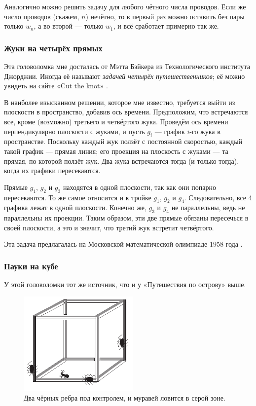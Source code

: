 Аналогично можно решить задачу для любого чётного числа проводов. Если же число проводов (скажем, $n$) нечётно, то в первый раз можно оставить без пары только $w_n$, а во второй --- только $w_1$, и всё сработает примерно так же.

\subsubsection*{Жуки на четырёх прямых}

Эта головоломка мне досталась от Мэтта Бэйкера из Технологического института Джорджии.
Иногда её называют \emph{задачей четырёх путешественников};
её можно увидеть на сайте «Cut the knot» \cite{cut-the-knot}.

В наиболее изысканном решении, которое мне известно, требуется выйти из плоскости в пространство, добавив ось времени.
Предположим, что встречаются все, кроме (возможно) третьего и четвёртого жука.
Проведём ось времени перпендикулярно плоскости с жуками, и пусть $g_i$ --- график $i$-го жука в пространстве.
Поскольку каждый жук ползёт с постоянной скоростью, каждый такой график --- прямая линия; его проекция на плоскость с жуками --- та прямая, по которой ползёт жук.
Два жука встречаются тогда (и только тогда), когда их графики пересекаются.

Прямые $g_1$, $g_2$ и $g_3$ находятся в одной плоскости, так как они попарно пересекаются. То же самое относится и к тройке  $g_1$, $g_2$ и $g_4$.
Следовательно, все 4 графика лежат в одной плоскости.
Конечно же, $g_3$ и $g_4$ не параллельны, ведь не параллельны их проекции.
Таким образом, эти две прямые обязаны пересечься в своей плоскости,
а это и значит, что третий жук встретит четвёртого.

\begin{addedbytheeditors}
Эта задача предлагалась на Московской математической олимпиаде 1958 года \cite[Задача 78148]{problems.ru}.
\pr
\end{addedbytheeditors}

\subsubsection*{Пауки на кубе}

У этой головоломки тот же источник, что и у «Путешествия по острову» выше.

\begin{figure}[ht!]
\centering
\includegraphics[scale=1]{pics/cube}
\caption{Два чёрных ребра под контролем, и муравей ловится в серой зоне.}
\label{pic:cube}
\end{figure}

